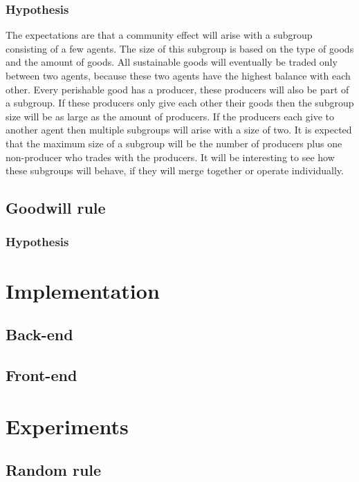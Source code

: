 \documentclass[twoside,openright]{uva-bachelor-thesis}
\begin{document}
\subsection{Hypothesis}
The expectations are that a community effect will arise with a subgroup consisting of a few agents. The size of this subgroup is based on the type of goods and the amount of goods. All sustainable goods will eventually be traded only between two agents, because these two agents have the highest balance with each other. Every perishable good has a producer, these producers will also be part of a subgroup. If these producers only give each other their goods then the subgroup size will be as large as the amount of producers. If the producers each give to another agent then multiple subgroups will arise with a size of two. It is expected that the maximum size of a subgroup will be the number of producers plus one non-producer who trades with the producers. It will be interesting to see how these subgroups will behave, if they will merge together or operate individually.

\section{Goodwill rule}

\subsection{Hypothesis}

\chapter{Implementation}

\section{Back-end}

\section{Front-end}

\chapter{Experiments}

\section{Random rule}
\end{document}
